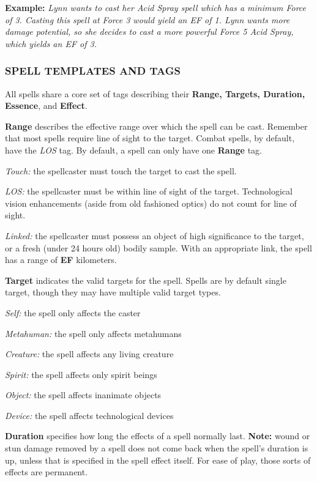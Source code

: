 \documentclass[oneside,10pt]{article}
\begin{document}
\begin{multicols}{2}
\begin{dent}
\textbf{Example:} \textit{Lynn wants to cast her Acid Spray spell which has a minimum Force of 3. Casting this spell at Force 3 would yield an EF of 1. Lynn wants more damage potential, so she decides to cast a more powerful Force 5 Acid Spray, which yields an EF of 3.}
\end{dent}


\subsubsection{SPELL TEMPLATES AND TAGS}

All spells share a core set of tags describing their \textbf{Range, Targets, Duration, Essence}, and \textbf{Effect}.

\textbf{Range} describes the effective range over which the spell can
be cast. Remember that most spells require line of sight to the
target. Combat spells, by default, have the \textit{LOS} tag. By default, a spell can only have one \textbf{Range} tag.
\begin{dent}

\textit{Touch:} the spellcaster must touch the target to cast the
spell.

\textit{LOS:} the spellcaster must be within line of sight of the target. Technological vision enhancements (aside from old fashioned optics) do not count for line of sight.

\textit{Linked:} the spellcaster must possess an object of high significance to the target, or a fresh (under 24 hours old) bodily sample. With an appropriate link, the spell has a range of \textbf{EF} kilometers.

\end{dent}
\textbf{Target} indicates the valid targets for the spell. Spells are by
default single target, though they may have multiple valid
target types.
\begin{dent}

\textit{Self:} the spell only affects the caster

\textit{Metahuman:} the spell only affects metahumans

\textit{Creature:} the spell affects any living creature

\textit{Spirit:} the spell affects only spirit beings

\textit{Object:} the spell affects inanimate objects

\textit{Device:} the spell affects technological devices
\end{dent}
\textbf{Duration} specifies how long the effects of a spell normally
last. \textbf{Note:} wound or stun damage removed by a spell does
not come back when the spell’s duration is up, unless that is
specified in the spell effect itself. For ease of play, those sorts
of effects are permanent.
\begin{dent}


\end{dent}
\end{multicols}
\end{document}
